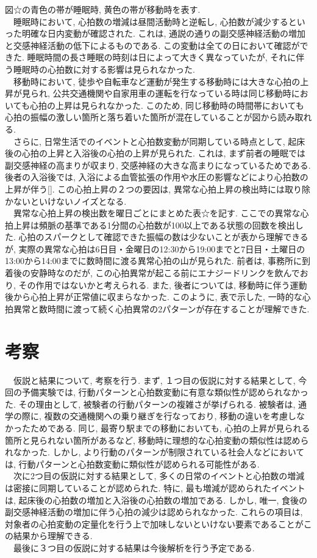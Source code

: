 \documentclass[report, 11pt, a4paper]{jsbook}
\begin{document}
図☆の青色の帯が睡眠時, 黄色の帯が移動時を表す. \\
　睡眠時において, 心拍数の増減は昼間活動時と逆転し, 心拍数が減少するといった明確な日内変動が確認された. これは, 通説の通りの副交感神経活動の増加と交感神経活動の低下によるものである. この変動は全ての日において確認ができた. 睡眠時間の長さ睡眠の時刻は日によって大きく異なっていたが, それに伴う睡眠時の心拍数に対する影響は見られなかった. \\
　移動時において, 徒歩や自転車など運動が発生する移動時には大きな心拍の上昇が見られ, 公共交通機関や自家用車の運転を行なっている時は同じ移動時においても心拍の上昇は見られなかった. このため, 同じ移動時の時間帯においても心拍の振幅の激しい箇所と落ち着いた箇所が混在していることが図から読み取れる. \\
　さらに, 日常生活でのイベントと心拍数変動が同期している時点として, 起床後の心拍の上昇と入浴後の心拍の上昇が見られた. これは, まず前者の睡眠では副交感神経の高まりが収まり, 交感神経の大きな高まりになっているためである. 後者の入浴後では, 入浴による血管拡張の作用や水圧の影響などにより心拍数の上昇が伴う[]. この心拍上昇の２つの要因は, 異常な心拍上昇の検出時には取り除かないといけないノイズとなる. \\
　異常な心拍上昇の検出数を曜日ごとにまとめた表☆を記す.  ここでの異常な心拍上昇は頻脈の基準である1分間の心拍数が100以上である状態の回数を検出した. 心拍のスパークとして確認できた振幅の数は少ないことが表から理解できるが, 実際の異常な心拍は6日目・金曜日の12:30から19:00までと7日目・土曜日の13:00から14:00までに数時間に渡る異常心拍の山が見られた. 前者は, 事務所に到着後の安静時なのだが, この心拍異常が起こる前にエナジードリンクを飲んでおり, その作用ではないかと考えられる. また, 後者については, 移動時に伴う運動後から心拍上昇が正常値に収まらなかった. このように, 表で示した, 一時的な心拍異常と数時間に渡って続く心拍異常の2パターンが存在することが理解できた. \\

\section{考察}
　仮説と結果について, 考察を行う. まず, １つ目の仮説に対する結果として, 今回の予備実験では, 行動パターンと心拍数変動に有意な類似性が認められなかった. その理由として, 被験者の行動パターンの複雑さが挙げられる. 被験者は, 通学の際に, 複数の交通機関への乗り継ぎを行なっており, 移動の違いを考慮しなかったためである. 同じ, 最寄り駅までの移動においても, 心拍の上昇が見られる箇所と見られない箇所があるなど, 移動時に理想的な心拍変動の類似性は認められなかった. しかし, より行動のパターンが制限されている社会人などにおいては, 行動パターンと心拍数変動に類似性が認められる可能性がある.\\
　次に2つ目の仮説に対する結果として, 多くの日常のイベントと心拍数の増減は密接に同期していることが認められた. 特に, 最も増減が認められたイベントは, 起床後の心拍数の増加と入浴後の心拍数の増加である. しかし, 唯一, 食後の副交感神経活動の増加に伴う心拍の減少は認められなかった. これらの項目は, 対象者の心拍変動の定量化を行う上で加味しないといけない要素であることがこの結果から理解できる. \\
　最後に３つ目の仮説に対する結果は今後解析を行う予定である.
\end{document}
